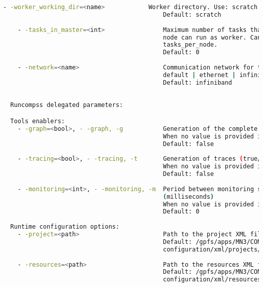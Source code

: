 \begin{lstlisting}[language=bash]
    - -worker_working_dir=<name>            Worker directory. Use: scratch | gpfs
                                            Default: scratch
                                            
    - -tasks_in_master=<int>                Maximum number of tasks that the master
                                            node can run as worker. Cannot exceed 
                                            tasks_per_node.
                                            Default: 0
                                            
    - -network=<name>                       Communication network for transfers:
                                            default | ethernet | infiniband | data.
                                            Default: infiniband
          
          
  Runcompss delegated parameters:

  Tools enablers:
    - -graph=<bool>, - -graph, -g           Generation of the complete graph (true/false)
                                            When no value is provided it is set to true
                                            Default: false
                                            
    - -tracing=<bool>, - -tracing, -t       Generation of traces (true/false)
                                            When no value is provided it is set to true
                                            Default: false
                                            
    - -monitoring=<int>, - -monitoring, -m  Period between monitoring samples 
                                            (milliseconds)
                                            When no value is provided it is set to 2000
                                            Default: 0
                                            
  Runtime configuration options:
    - -project=<path>                       Path to the project XML file
                                            Default: /gpfs/apps/MN3/COMPSs/1.3/Runtime/
                                            configuration/xml/projects/project.xml
                                            
    - -resources=<path>                     Path to the resources XML file
                                            Default: /gpfs/apps/MN3/COMPSs/1.3/Runtime/
                                            configuration/xml/resources/resources.xml
                                            

\end{lstlisting}

